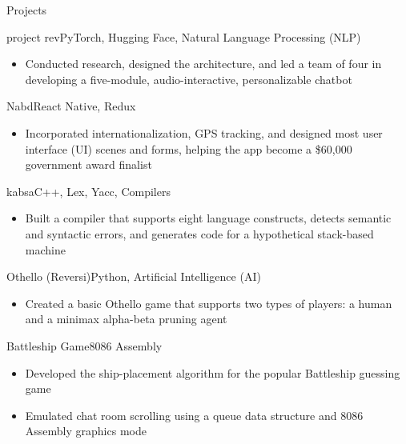 \documentclass[]{mcdowellcv}
\begin{document}
	\begin{cvsection}{Projects}
		\begin{cvsubsection}{project rev}{}{PyTorch, Hugging Face, Natural Language Processing (NLP)}
			\begin{itemize}
				\item Conducted research, designed the architecture, and led a team of four in developing a five-module, audio-interactive, personalizable chatbot
			\end{itemize}
		\end{cvsubsection}
		\begin{cvsubsection}{Nabd}{}{React Native, Redux}
			\begin{itemize}
				\item Incorporated internationalization, GPS tracking, and designed most user interface (UI) scenes and forms, helping the app become a \$60,000 government award finalist
			\end{itemize}
		\end{cvsubsection}
		\begin{cvsubsection}{kabsa}{}{C++, Lex, Yacc, Compilers}
			\begin{itemize}
				\item Built a compiler that supports eight language constructs, detects semantic and syntactic errors, and generates code for a hypothetical stack-based machine
			\end{itemize}
		\end{cvsubsection}
		\begin{cvsubsection}{Othello (Reversi)}{}{Python, Artificial Intelligence (AI)}
			\begin{itemize}
				\item Created a basic Othello game that supports two types of players: a human and a minimax alpha-beta pruning agent
			\end{itemize}
		\end{cvsubsection}
		\begin{cvsubsection}{Battleship Game}{}{8086 Assembly}
			\begin{itemize}
				\item Developed the ship-placement algorithm for the popular Battleship guessing game
				\item Emulated chat room scrolling using a queue data structure and 8086 Assembly graphics mode
			\end{itemize}
		\end{cvsubsection}
	\end{cvsection}
	
\end{document}
